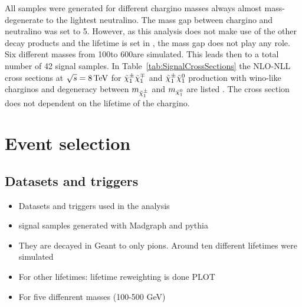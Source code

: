 All samples were generated for different chargino masses always almost mass-degenerate to the lightest neutralino.
The mass gap between chargino and neutralino was set to 5\gev.
However, as this analysis does not make use of the other decay products and the lifetime is set in \geant, the mass gap does not play any role.
Six different masses from 100\gev to 600\gev are simulated.
This leads then to a total number of 42 signal samples.
In Table~\ref{tab:SignalCrossSections} the NLO-NLL cross sections at $\sqrt{s}=8\,\text{Te}\kern-0.06667em\text{V}$ for $\tilde{\chi}^{\pm}_{1}\tilde{\chi}^{\mp}_{1}$ and $\tilde{\chi}^{\pm}_{1}\tilde{\chi}^{0}_{1}$ production 
with wino-like charginos and degeneracy between $m_{\tilde{\chi}^{\pm}_{1}}$ and $m_{\tilde{\chi}^{0}_{1}}$ are listed \cite{bib:SignalCrossSection_2012,bib:SignalCrossSection_2013}.
The cross section does not dependent on the lifetime of the chargino.
\renewcommand{\arraystretch}{1.5}
\begin{table}[!h]
\centering
\caption{Produced signal simulated samples with corresponding cross sections}
\label{tab:SignalCrossSections}
\end{table}  

\section{Event selection}
\label{sec:EventSelection}
\subsection{Datasets and triggers}
\begin{itemize}
\item Datasets and triggers used in the analysis
\item signal samples generated with Madgraph and pythia
\item They are decayed in Geant to only pions. Around ten different lifetimes were simulated
\item For other lifetimes: lifetime reweighting is done PLOT
\item For five diffenrent masses (100-500 GeV) 
\end{itemize}
